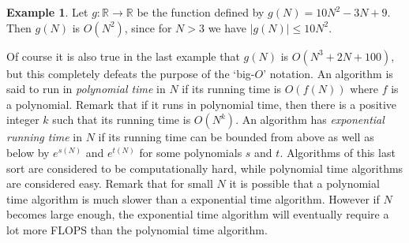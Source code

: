 \documentclass{article}
\numberwithin{equation}{section}
\theoremstyle{definition}
\newtheorem{example}[theorem]{Example}
\newcommand{\RR}{{\mathbb R}} %
\begin{document}
\begin{example}
Let $g:\RR \rightarrow \RR$ be the function defined by $g(N)=10N^2-3N+9$. Then $g(N)$ is $O(N^2)$, since for $N>3$ we have $|g(N)| \leq 10N^2$.
\end{example}


Of course it is also true in the last example that $g(N)$ is $O(N^3+2N+100)$, but this completely defeats the purpose of the `big-$O$'   notation. An algorithm is said to run in \emph{polynomial time} in $N$ if its running time is $O(f(N))$ where $f$ is a polynomial. Remark that if it runs in polynomial time, then there is a positive integer $k$ such that its running time is $O(N^k)$. An algorithm has \emph{exponential running time} in $N$ if its running time can be bounded from above as well as below by $e^{s(N)}$ and $e^{t(N)}$ for some polynomials $s$ and $t$. Algorithms of this last sort are considered to be computationally hard, while polynomial time algorithms are considered easy. Remark that for small $N$ it is possible that a polynomial time algorithm is much slower than a exponential time algorithm. However if $N$ becomes large enough, the exponential time algorithm will eventually require a lot more FLOPS than the polynomial time algorithm.
\end{document}
